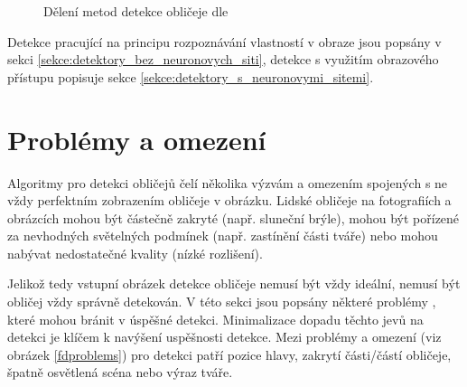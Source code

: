\begin{figure}[H]
  \begin{center}
  \label{fddeleni}
  \caption{Dělení metod detekce obličeje dle \cite{feature-based-fd-review}}
  \end{center}
\end{figure}

Detekce pracující na principu rozpoznávání vlastností v obraze jsou popsány v sekci 
\ref{sekce:detektory_bez_neuronovych_siti}, 
detekce s využitím obrazového přístupu popisuje sekce \ref{sekce:detektory_s_neuronovymi_sitemi}.



\section{Problémy a omezení}
Algoritmy pro detekci obličejů čelí několika výzvám a omezením spojených s ne vždy perfektním zobrazením obličeje v obrázku. Lidské obličeje na fotografiích a obrázcích mohou být částečně zakryté (např. sluneční brýle), mohou být pořízené za nevhodných světelných podmínek (např. zastínění části tváře) nebo mohou nabývat nedostatečné kvality (nízké rozlišení).

Jelikož tedy vstupní obrázek detekce obličeje nemusí být vždy ideální, nemusí být obličej vždy správně detekován.
V této sekci jsou popsány některé problémy \cite{feature-based-fd-review}, které mohou bránit v úspěšné detekci. Minimalizace dopadu těchto jevů na detekci je klíčem k navýšení uspěšnosti detekce. Mezi problémy a omezení (viz obrázek \ref{fdproblems}) pro detekci patří pozice hlavy, zakrytí části/částí obličeje, špatně osvětlená scéna nebo výraz tváře.

